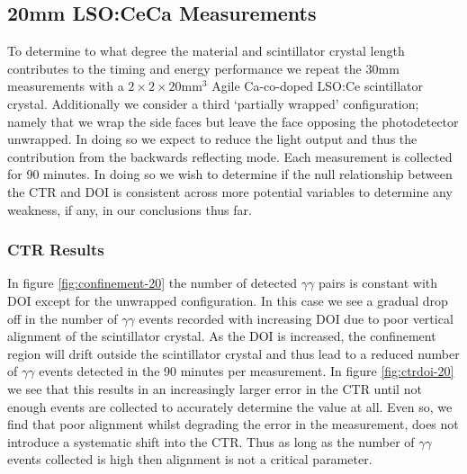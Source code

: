 \subsection{20mm LSO:CeCa Measurements}
\label{sec:20mm}

To determine to what degree the material and scintillator crystal length contributes to the timing and energy performance we repeat the 30mm measurements with a $2\times2\times20$mm$^3$ Agile Ca-co-doped LSO:Ce scintillator crystal. Additionally we consider a third `partially wrapped' configuration; namely that we wrap the side faces but leave the face opposing the photodetector unwrapped. In doing so we expect to reduce the light output and thus the contribution from the backwards reflecting mode. Each measurement is collected for 90 minutes. In doing so we wish to determine if the null relationship between the CTR and DOI is consistent across more potential variables  to determine any weakness, if any, in our conclusions thus far.

\subsubsection{CTR Results}
In figure \ref{fig:confinement-20} the number of detected $\gamma\gamma$ pairs is constant with DOI except for the unwrapped configuration. In this case we see a gradual drop off in the number of $\gamma\gamma$ events recorded with increasing DOI due to poor vertical alignment of the scintillator crystal. As the DOI is increased, the confinement region will drift outside the scintillator crystal and thus lead to a reduced number of $\gamma\gamma$ events detected in the 90 minutes per measurement. In figure \ref{fig:ctrdoi-20} we see that this results in an increasingly larger error in the CTR until not enough events are collected to accurately determine the value at all. Even so, we find that poor alignment whilst degrading the error in the measurement, does not introduce a systematic shift into the CTR. Thus as long as the number of $\gamma\gamma$ events collected is high then alignment is not a critical parameter. 
